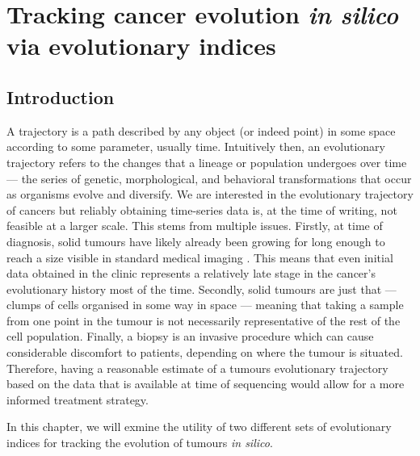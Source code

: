 \chapter{Tracking cancer evolution \textit{in silico} via evolutionary indices}\label{chapter:trajectories}

\section{Introduction}
A trajectory is a path described by any object (or indeed point) in some space according to some parameter, usually time.  Intuitively then, an evolutionary trajectory refers to the changes that a lineage or population undergoes over time --- the series of genetic, morphological, and behavioral transformations that occur as organisms evolve and diversify. We are interested in the evolutionary trajectory of cancers but reliably obtaining time-series data is, at the time of writing, not feasible at a larger scale. This stems from multiple issues. Firstly, at time of diagnosis, solid tumours have likely already been growing for long enough to reach a size visible in standard medical imaging \cite{patrone_how_2011}. This means that even initial data obtained in the clinic represents a relatively late stage in the cancer's evolutionary history most of the time. Secondly, solid tumours are just that --- clumps of cells organised in some way in space --- meaning that taking a sample from one point in the tumour is not necessarily representative of the rest of the cell population. Finally, a biopsy is an invasive procedure which can cause considerable discomfort to patients, depending on where the tumour is situated. Therefore, having a reasonable estimate of a tumours evolutionary trajectory based on the data that is available at time of sequencing would allow for a more informed treatment strategy.\par
In this chapter, we will exmine the utility of two different sets of evolutionary indices for tracking the evolution of tumours \textit{in silico}.

